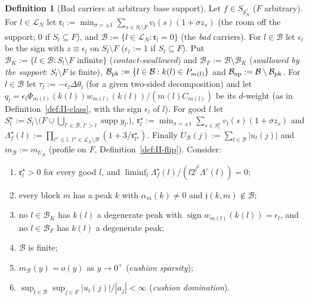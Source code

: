 \documentclass[10pt]{amsart}
\theoremstyle{definition}
\newtheorem{definition}[theorem]{Definition}
\theoremstyle{remark}
\newcommand{\supp}{\operatorname{supp}}
\newcommand{\sgn}{\operatorname{sign}}
\begin{document}
\begin{definition}[Bad carriers at arbitrary base support]
\label{def:II-badinf}
Let $f\in S_{p_N^*}$ \textup{(}$F$ arbitrary\textup{)}.  For
$l\in\mathcal L_N$ let $\mathfrak r_l:=\min_{\sigma=\pm1}\sum_{s\in
S_l\setminus F}v_l(s)(1+\sigma z_s)$ (the room off the support; $0$ if
$S_l\subseteq F$), and $\mathcal B:=\{l\in\mathcal L_N:\mathfrak r_l=0\}$
(the \emph{bad} carriers).  For $l\in\mathcal B$ let $\epsilon_l$ be the sign
with $z\equiv\epsilon_l$ on $S_l\setminus F$ ($\epsilon_l:=1$ if
$S_l\subseteq F$).  Put $\mathcal B_K:=\{l\in\mathcal B:S_l\setminus F
\text{ infinite}\}$ (\emph{contact-swallowed}) and $\mathcal B_F:=\mathcal B
\setminus\mathcal B_K$ (\emph{swallowed by the support}: $S_l\setminus F$ is
finite), $\mathcal B_{\rm pk}:=\{l\in\mathcal B:k(l)\in P_{m(l)}\}$ and
$\mathcal B_{\rm np}:=\mathcal B\setminus\mathcal B_{\rm pk}$.  For
$l\in\mathcal B$ let $\tau_l:=-\epsilon_l\Delta\theta_l$ (for a given
two-sided decomposition) and let $q_l=\epsilon_l\Phi_{m(l)}(k(l))
w_{m(l)}(k(l))/(m(l)C_{m(l)})$ be its $d$-weight (as in Definition~\ref{def:II-class}, with the sign $\epsilon_l$ of $l$).  For good $l$ let $S^\star_l:=S_l\setminus
\big(F\cup\bigcup_{l'\in\mathcal B,\,l'>l}\supp y_{l'}\big)$,
$\mathfrak r^\star_l:=\min_{\sigma=\pm1}\sum_{s\in S^\star_l}v_l(s)
(1+\sigma z_s)$ and $\Lambda^\star_f(l):=\prod_{l''\le l,\,l''\in\mathcal L_N
\setminus\mathcal B}(1+3/\mathfrak r^\star_{l''})$.  Finally
$U_{\mathcal B}(j):=\sum_{l\in\mathcal B}|u_l(j)|$ and $m_{\mathcal B}:=
m_{U_{\mathcal B}}$ (profile on $F$, Definition~\ref{def:II-flip}).
Consider:
\begin{enumerate}
\item[(W$^\star$)] $\mathfrak r^\star_l>0$ for every good $l$, and
$\liminf_l\Lambda^\star_f(l)/(l2^{l^3}\Lambda^\circ(l))=0$;
\item[(H2)] every block $m$ has a peak $k$ with $\alpha_m(k)\ne0$ and
$\mathfrak j(k,m)\notin\mathcal B$;
\item[(H3-inf)] no $l\in\mathcal B_K$ has $k(l)$ a degenerate peak with
$\sgn w_{m(l)}(k(l))=\epsilon_l$, and no $l\in\mathcal B_F$ has $k(l)$ a
degenerate peak;
\item[($\mathcal B_{\rm fin}$)] $\mathcal B$ is finite;
\item[(CS$_{\mathcal B}$)] $m_{\mathcal B}(y)=o(y)$ as $y\to0^+$
(\emph{cushion sparsity});
\item[(H4-inf)] $\sup_{l\in\mathcal B}\sup_{j\in F}|u_l(j)|/|a_j|<\infty$
(\emph{cushion domination}).
\end{enumerate}
\end{definition}
\end{document}
